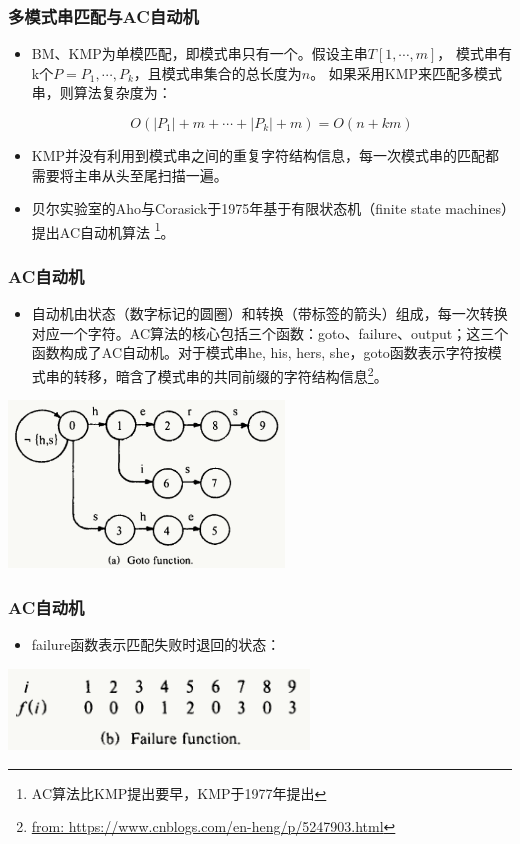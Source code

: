 \begin{frame}[fragile]
  \frametitle{多模式串匹配与AC自动机}
    \begin{itemize}
    \item BM、KMP为单模匹配，即模式串只有一个。假设主串$T[1, \cdots, m]$，
    模式串有k个$P={P_1,\cdots,P_k}$，且模式串集合的总长度为$n$。
    如果采用KMP来匹配多模式串，则算法复杂度为：

    \[O(|P_1|+m+\cdots+|P_k|+m)=O(n+km)\]
  
    \item KMP并没有利用到模式串之间的重复字符结构信息，每一次模式串的匹配都需要将主串从头至尾扫描一遍。

    \item 贝尔实验室的Aho与Corasick于1975年基于有限状态机（finite state machines）提出AC自动机算法
  \footnote{AC算法比KMP提出要早，KMP于1977年提出}。
  \end{itemize}
\end{frame}

\begin{frame}[fragile]
  \frametitle{AC自动机}
  \begin{itemize}
  \item 自动机由状态（数字标记的圆圈）和转换（带标签的箭头）组成，每一次转换对应一个字符。AC算法的核心包括三个函数：goto、failure、output；这三个函数构成了AC自动机。对于模式串{he, his, hers, she}，goto函数表示字符按模式串的转移，暗含了模式串的共同前缀的字符结构信息\footnote{\url{from: https://www.cnblogs.com/en-heng/p/5247903.html}}。
  \end{itemize}

  \begin{center}
  \includegraphics[width=0.55\textwidth]{figs/string/ac_goto.png}
  \end{center}
\end{frame}

\begin{frame}[fragile]
  \frametitle{AC自动机}
  \begin{itemize}
  \item failure函数表示匹配失败时退回的状态：
  \end{itemize}

  \begin{center}
  \includegraphics[width=0.6\textwidth]{figs/string/ac_failure.png}
  \end{center}
\end{frame}

